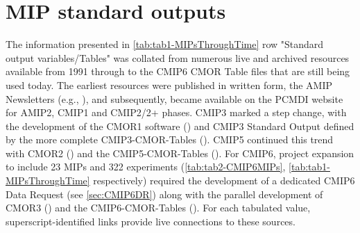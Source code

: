 \documentclass[gmd, preprint]{copernicus}
\begin{document}
\section{MIP standard outputs}    %
\label{sec:secAppB1-MIPStandardOutput}
The information presented in \autoref{tab:tab1-MIPsThroughTime} row "Standard output variables/Tables" was collated from numerous live and archived resources available from 1991 through to the CMIP6 CMOR Table files that are still being used today. The earliest resources were published in written form, the AMIP Newsletters (e.g., \citet{gates_amip_1991}), and subsequently, became available on the PCMDI website for AMIP2, CMIP1 and CMIP2/2+ phases. CMIP3 marked a step change, with the development of the CMOR1 software (\citet{taylor_cmor_2006}) and CMIP3 Standard Output defined by the more complete CMIP3-CMOR-Tables (\citet{doutriaux_cmip3_2005}). CMIP5 continued this trend with CMOR2 (\citet{doutriaux_cmor_2011}) and the CMIP5-CMOR-Tables (\citet{doutriaux_cmip5_2013}). For CMIP6, project expansion to include 23 MIPs and 322 experiments (\autoref{tab:tab2-CMIP6MIPs}, \autoref{tab:tab1-MIPsThroughTime} respectively) required the development of a dedicated CMIP6 Data Request (see \autoref{sec:CMIP6DR}) along with the parallel development of CMOR3 (\citet{mauzey_cmor_2024}) and the CMIP6-CMOR-Tables (\citet{nadeau_cmip6_2017}). For each tabulated value, superscript-identified links provide live connections to these sources.
\end{document}
